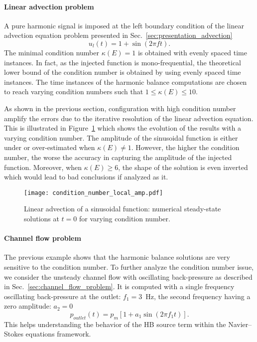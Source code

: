 \paragraph{Linear advection problem}

A pure harmonic signal is imposed at the left boundary condition
of the linear advection equation problem presented 
in Sec.~\ref{sec:presentation_advection}
\begin{equation}
   u_l (t) = 1 + \sin \left(2 \pi f t\right).
\end{equation}
The minimal condition number
$\kappa(E) = 1$ is obtained with evenly spaced time instances.
In fact, as the injected function is mono-frequential, 
the theoretical lower bound of the condition number is obtained by using evenly
spaced time instances.
The time instances of the harmonic balance
computations are chosen to reach varying condition numbers
such that $1 \leq \kappa (E) \leq 10$.  

As shown in the previous section, configuration with
high condition number amplify the errors due to
the iterative resolution of the linear advection equation.
This is illustrated in Figure~\ref{fig:condition_number_local_amp} which 
shows the evolution of the results with a varying condition number.
The amplitude of the
sinusoidal function is either under or over-estimated when
$\kappa (E) \neq 1$. However, 
the higher the condition number, the worse the accuracy in capturing
the amplitude of the injected function. Moreover, when $\kappa(E) \geq 6$,
the shape of the solution is even inverted which would lead to
bad conclusions if analyzed as it.
\begin{figure}[htp]
  \centering
  \texttt{[image: condition\_number\_local\_amp.pdf]}
  \caption{Linear advection of a sinusoidal function: numerical steady-state 
  solutions at $t=0$ for varying condition number.}
  \label{fig:condition_number_local_amp}
\end{figure}

\paragraph{Channel flow problem}
The previous example shows that the harmonic
balance solutions are very sensitive to the condition number.
To further analyze the condition number issue,
we consider the unsteady channel flow with 
oscillating back-pressure as described in 
Sec.~\ref{sec:channel_flow_problem}.
It is computed with a single
frequency oscillating back-pressure 
at the outlet: $f_1 = 3$~Hz, the second
frequency having a zero amplitude: $a_2= 0$
\begin{equation}
   p_{outlet} (t) = p_m \left[ 1 + a_1 \sin \left(2 \pi f_1 t\right) \right].
\end{equation}
This helps understanding the behavior of the HB source term
within the Navier--Stokes equations framework.

